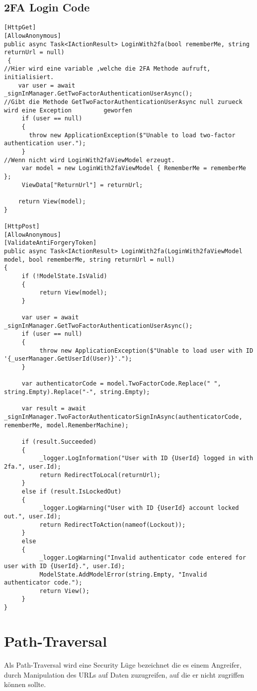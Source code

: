\subsection{2FA Login Code}
\label{sec:2FALogin}
\begin{lstlisting}
[HttpGet]
[AllowAnonymous]
public async Task<IActionResult> LoginWith2fa(bool rememberMe, string returnUrl = null)
 {
//Hier wird eine variable ,welche die 2FA Methode aufruft, initialisiert.
    var user = await _signInManager.GetTwoFactorAuthenticationUserAsync();
//Gibt die Methode GetTwoFactorAuthenticationUserAsync null zurueck wird eine Exception 	    geworfen
     if (user == null)
     {
       throw new ApplicationException($"Unable to load two-factor authentication user.");
     }
//Wenn nicht wird LoginWith2faViewModel erzeugt.
     var model = new LoginWith2faViewModel { RememberMe = rememberMe };
     ViewData["ReturnUrl"] = returnUrl;

    return View(model);
}

[HttpPost]
[AllowAnonymous]
[ValidateAntiForgeryToken]
public async Task<IActionResult> LoginWith2fa(LoginWith2faViewModel model, bool rememberMe, string returnUrl = null)
{
     if (!ModelState.IsValid)
     {
          return View(model);
     }

     var user = await _signInManager.GetTwoFactorAuthenticationUserAsync();
     if (user == null)
     {
          throw new ApplicationException($"Unable to load user with ID '{_userManager.GetUserId(User)}'.");
     }

     var authenticatorCode = model.TwoFactorCode.Replace(" ", string.Empty).Replace("-", string.Empty);

     var result = await _signInManager.TwoFactorAuthenticatorSignInAsync(authenticatorCode, rememberMe, model.RememberMachine);

     if (result.Succeeded)
     {
          _logger.LogInformation("User with ID {UserId} logged in with 2fa.", user.Id);
          return RedirectToLocal(returnUrl);
     }
     else if (result.IsLockedOut)
     {
          _logger.LogWarning("User with ID {UserId} account locked out.", user.Id);
          return RedirectToAction(nameof(Lockout));
     }
     else
     {
          _logger.LogWarning("Invalid authenticator code entered for user with ID {UserId}.", user.Id);
          ModelState.AddModelError(string.Empty, "Invalid authenticator code.");
          return View();
     }
}
\end{lstlisting}
\section{Path-Traversal}
\label{sec:Path-Traversal}
Als Path-Traversal wird eine Security Lüge bezeichnet die es einem Angreifer, durch Manipulation des URLs auf Daten zuzugreifen, auf die er nicht zugriffen können sollte. 
